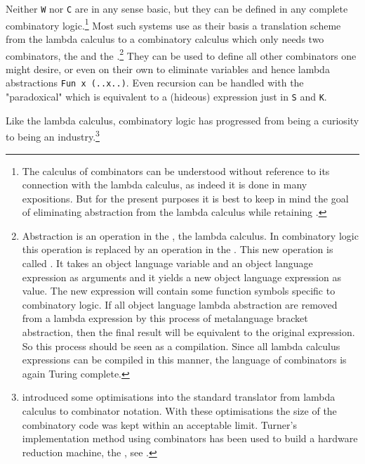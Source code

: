 Neither \verb#W# nor \verb#C# are in any sense basic,
but they can be defined in any complete combinatory logic.\footnote{
The calculus of combinators can be understood without reference
to its connection with the lambda calculus,
as indeed it is done in many expositions.
But for the present purposes it is best to keep
in mind the goal of eliminating abstraction from the lambda calculus
while retaining .
}
Most such systems use as their basis a translation scheme from
the lambda calculus to a combinatory calculus
which only needs two combinators,
the  and the .\footnote{
Abstraction is an operation in the ,
the lambda calculus.
In combinatory logic this operation is replaced by
an operation in the .
This new operation is called .
It takes an object language variable
and an object language expression as arguments
and it yields a new object language expression as value.
The new expression will contain some function symbols
specific to combinatory logic.
If all object language lambda abstraction are removed from
a lambda expression by this process of metalanguage bracket abstraction,
then the final result will be equivalent to the original expression.
So this process should be seen as a compilation.
Since all lambda calculus expressions can be compiled in this manner,
the language of combinators is again Turing complete.
}
They can be used to define all other combinators one might
desire,
or even on their own to eliminate variables and hence lambda abstractions
\verb#Fun x (..x..)#.
Even recursion can be handled with the "paradoxical" 
which is equivalent to a (hideous) expression just in \verb#S# and \verb#K#.
\par
Like the lambda calculus,
combinatory logic has progressed from being
a curiosity to being an industry.\footnote{
introduced some optimisations
into the standard translator from lambda calculus
to combinator notation.
With these optimisations the size of the combinatory code
was kept within an acceptable limit.
Turner's implementation method using combinators has been used
to build a hardware reduction machine,
the , see
.
}
